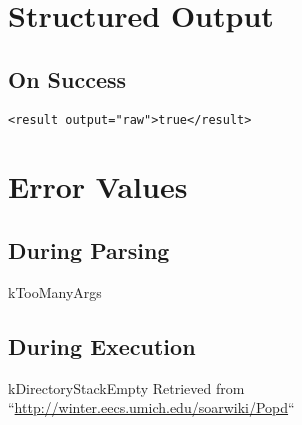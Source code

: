 \documentclass[10pt]{article}
\begin{document}
\section*{ Structured Output }
\subsection*{ On Success }
\begin{verbatim}
<result output="raw">true</result>

\end{verbatim}
\section*{ Error Values }
\subsection*{ During Parsing }


 kTooManyArgs
\subsection*{ During Execution }


 kDirectoryStackEmpty Retrieved from ``\url{http://winter.eecs.umich.edu/soarwiki/Popd}``
\end{document}
